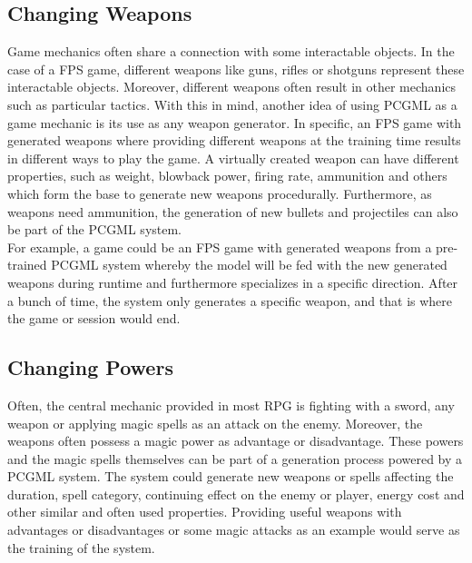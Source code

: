 \documentclass[MGS,Master,english]{twbook}%
\begin{document}
\subsection{Changing Weapons} \label{idea::changingWeapons}
Game mechanics often share a connection with some interactable objects. In the case of a \ac{FPS} game, different weapons like guns, rifles or shotguns represent these interactable objects. Moreover, different weapons often result in other mechanics such as particular tactics. With this in mind, another idea of using PCGML as a game mechanic is its use as any weapon generator. In specific, an FPS game with generated weapons where providing different weapons at the training time results in different ways to play the game. A virtually created weapon can have different properties, such as weight, blowback power, firing rate, ammunition and others which form the base to generate new weapons procedurally. Furthermore, as weapons need ammunition, the generation of new bullets and projectiles can also be part of the PCGML system. \\
For example, a game could be an FPS game with generated weapons from a pre-trained PCGML system whereby the model will be fed with the new generated weapons during runtime and furthermore specializes in a specific direction. After a bunch of time, the system only generates a specific weapon, and that is where the game or session would end.

\subsection{Changing Powers} \label{idea::changingPowers}
Often, the central mechanic provided in most \ac{RPG} is fighting with a sword, any weapon or applying magic spells as an attack on the enemy. Moreover, the weapons often possess a magic power as advantage or disadvantage. These powers and the magic spells themselves can be part of a generation process powered by a PCGML system. The system could generate new weapons or spells affecting the duration, spell category, continuing effect on the enemy or player, energy cost and other similar and often used properties. Providing useful weapons with advantages or disadvantages or some magic attacks as an example would serve as the training of the system.
\end{document}
